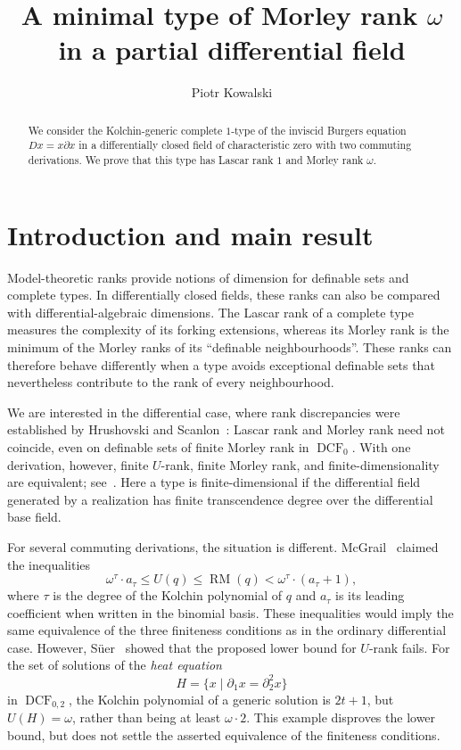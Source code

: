 \documentclass[11pt,a4paper]{amsart}
\title[A minimal type of Morley rank $\omega$]{A minimal type of Morley rank $\omega$\texorpdfstring{\\}{ }in a partial differential field}
\author[P. KOWALSKI]{Piotr Kowalski}
\theoremstyle{definition}
\newcommand{\DCF}{\operatorname{DCF}}
\newcommand{\RM}{\operatorname{RM}}
\begin{document}
\begin{abstract}
We consider the Kolchin-generic complete $1$-type of the inviscid Burgers equation
$Dx=x\partial x$ in a differentially closed field of characteristic zero
with two commuting derivations. We prove that this type has Lascar rank
$1$ and Morley rank $\omega$.
\end{abstract}
\maketitle

\section{Introduction and main result}

Model-theoretic ranks provide notions of dimension for definable sets
and complete types. In differentially closed fields, these ranks can
also be compared with differential-algebraic dimensions. The Lascar
rank of a complete type measures the complexity of its forking
extensions, whereas its Morley rank is the minimum of the Morley
ranks of its ``definable neighbourhoods''. These ranks can therefore
behave differently when a type avoids exceptional definable sets
that nevertheless contribute to the rank of every neighbourhood.

We are interested in the differential case, where rank discrepancies
were established by Hrushovski and Scanlon~\cite{HS}: Lascar rank and
Morley rank need not coincide, even on definable sets of finite
Morley rank in $\DCF_0$. With one derivation, however, finite
$U$-rank, finite Morley rank, and finite-dimensionality are
equivalent; see~\cite{Poizat}. Here a type is finite-dimensional
if the differential field generated by a realization has finite
transcendence degree over the differential base field.

For several commuting derivations, the situation is different.
McGrail~\cite{McGrail} claimed the inequalities
\[
 \omega^\tau\cdot a_\tau
 \leqslant U(q)
 \leqslant \RM(q)
 <\omega^\tau\cdot(a_\tau+1),
\]
where $\tau$ is the degree of the Kolchin polynomial of $q$ and
$a_\tau$ is its leading coefficient when written in the binomial
basis. These inequalities would imply the same equivalence of
the three finiteness conditions as in the ordinary differential
case. However, S\"uer~\cite{Suer} showed that the proposed lower
bound for $U$-rank fails. For the set of solutions of the \emph{heat equation}
\[
 H=\{x\mid \partial_1x=\partial_2^2x\}
\]
in $\DCF_{0,2}$, the Kolchin polynomial of a generic solution is
$2t+1$, but $U(H)=\omega$, rather than being at least
$\omega\cdot2$. This example disproves the lower bound, but does
not settle the asserted equivalence of the finiteness conditions.
\end{document}
